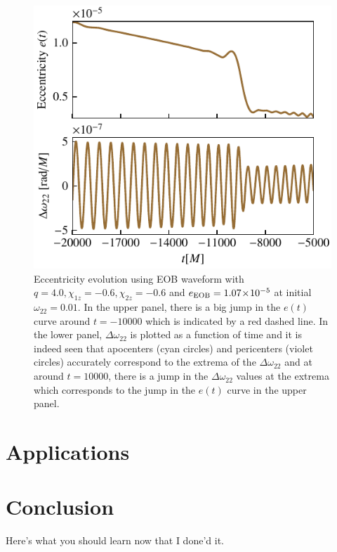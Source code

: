 \documentclass[aps,prd,amsmath,floats,floatfix, twocolumn,
superscriptaddress,nofootinbib,showpacs]{revtex4-1}
\newcommand{\into}{\!\times\!\relax} %
\newcommand{\eEOB}{e_{\text{EOB}}}
\newcommand{\resOmega}{\Delta \omega_{22}}
\begin{document}
\begin{figure}[thb]
  \centering
  \includegraphics[width=\columnwidth]{res_amp_glitches}
  \caption{Eccentricity evolution using EOB waveform with $q=4.0,
\chi_{1z}=-0.6, \chi_{2z}=-0.6$ and $\eEOB=1.07 \into 10^{-5}$ at
initial $\omega_{22} = 0.01$. In the upper panel, there is a big jump
in the $e(t)$ curve around $t=-10000$ which is indicated by a red
dashed line. In the lower panel, $\resOmega$ is plotted as a function
of time and it is indeed seen that apocenters (cyan circles) and
pericenters (violet circles) accurately correspond to the extrema of
the $\resOmega$ and at around $t=10000$, there is a jump in the
$\resOmega$ values at the extrema which corresponds to the jump in the
$e(t)$ curve in the upper panel.}
  \label{fig:res-amp-glitches}
\end{figure}


\section{Applications}
\label{sec:applications}


\section{Conclusion}
\label{sec:conclusion}
Here's what you should learn now that I done'd it.
\end{document}

